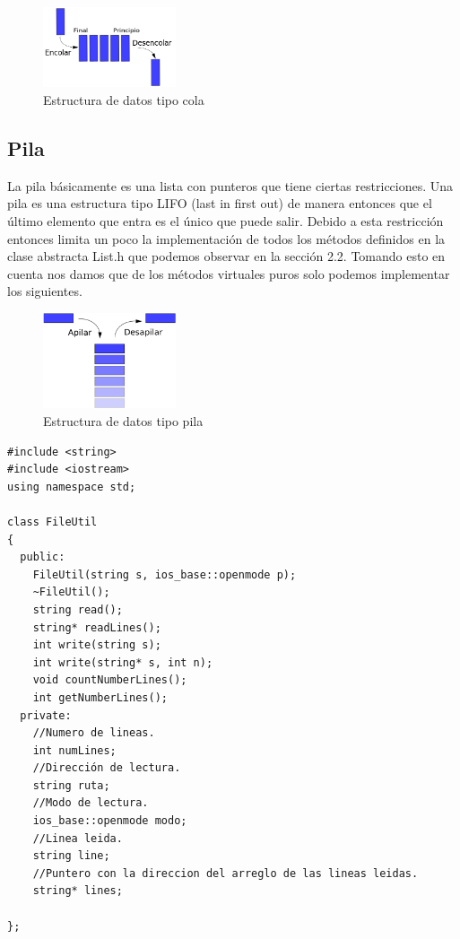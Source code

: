 \begin{figure}[H]
\centering
\includegraphics[width=0.35\textwidth]{imgs/Labo8/cola.png}
\caption{Estructura de datos tipo cola}
\label{fig:cola}
\end{figure}

\subsection{Pila}

La pila básicamente es una lista con punteros que tiene ciertas restricciones. Una pila es una estructura tipo LIFO (last in first out) de manera entonces que el último elemento que entra es el único que puede salir. Debido a esta restricción entonces limita un poco la implementación de todos los métodos definidos en la clase abstracta List.h que podemos observar en la sección 2.2. Tomando esto en cuenta nos damos que de los métodos virtuales puros solo podemos implementar los siguientes.

\begin{figure}[H]
\centering
\includegraphics[width=0.35\textwidth]{imgs/Labo8/pila.png}
\caption{Estructura de datos tipo pila}
\label{fig:pila}
\end{figure}



\begin{verbatim}
#include <string>
#include <iostream>
using namespace std;

class FileUtil
{
  public:
  	FileUtil(string s, ios_base::openmode p);
  	~FileUtil();
  	string read();
  	string* readLines();
  	int write(string s);
  	int write(string* s, int n);
    void countNumberLines();
    int getNumberLines();
  private:
    //Numero de lineas.
    int numLines;
    //Dirección de lectura.
    string ruta;
    //Modo de lectura.
  	ios_base::openmode modo;
    //Linea leida.
    string line;
    //Puntero con la direccion del arreglo de las lineas leidas.
    string* lines;

};
\end{verbatim}



